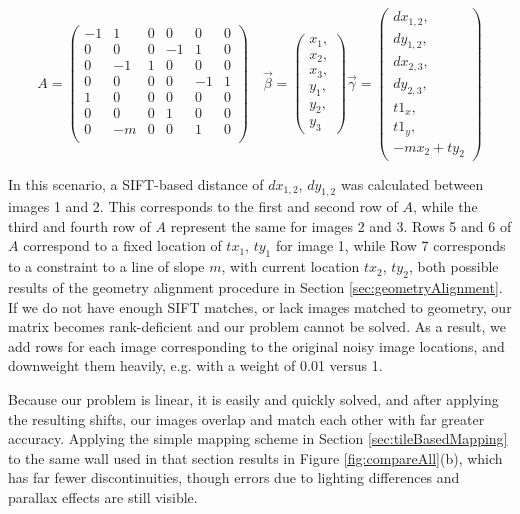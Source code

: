 \documentclass[]{spie}  %
\begin{document}
\[
A =
\begin{pmatrix}
  -1 & 1 & 0 & 0 & 0 & 0\\
  0 & 0 & 0 & -1 & 1 & 0\\
  0 & -1 & 1 & 0 & 0 & 0\\
  0 & 0 & 0 & 0 & -1 & 1\\
  1 & 0 & 0 & 0 & 0 & 0\\
  0 & 0 & 0 & 1 & 0 & 0\\
  0 & -m & 0 & 0 & 1 & 0\\
\end{pmatrix}\quad
\vec{\beta} =
\begin{pmatrix}
  x_1, \\ x_2, \\ x_3, \\ y_1, \\ y_2, \\ y_3
\end{pmatrix}
\vec{\gamma} =
\begin{pmatrix}
  dx_{1,2}, \\ dy_{1,2}, \\ dx_{2,3}, \\ dy_{2,3}, \\ t1_x, \\ t1_y,
  \\ -mx_2 + ty_2
\end{pmatrix}
\]


In this scenario, a SIFT-based distance of $dx_{1,2}$, $dy_{1,2}$ was
calculated between images 1 and 2. This corresponds to the first and
second row of $A$, while the third and fourth row of $A$ represent the
same for images 2 and 3. Rows 5 and 6 of $A$ correspond to a fixed
location of $tx_1$, $ty_1$ for image 1, while Row 7 corresponds to a
constraint to a line of slope $m$, with current location $tx_2$,
$ty_2$, both possible results of the geometry alignment procedure in
Section \ref{sec:geometryAlignment}. If we do not have enough SIFT
matches, or lack images matched to geometry, our matrix becomes
rank-deficient and our problem cannot be solved. As a result, we add
rows for each image corresponding to the original noisy image
locations, and downweight them heavily, e.g. with a weight of 0.01
versus 1.

Because our problem is linear, it is easily and quickly solved, and
after applying the resulting shifts, our images overlap and match each
other with far greater accuracy. Applying the simple mapping scheme in
Section \ref{sec:tileBasedMapping} to the same wall used in that
section results in Figure \ref{fig:compareAll}(b), which has far fewer
discontinuities, though errors due to lighting differences and
parallax effects are still visible.
\end{document}

